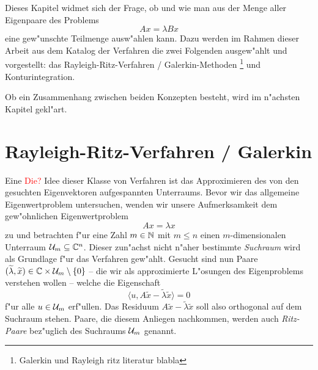 Dieses Kapitel widmet sich der Frage, ob und wie man aus der Menge aller Eigenpaare
des Problems
\[
Ax = \lambda Bx
\]
eine gew"unschte Teilmenge ausw"ahlen kann. Dazu werden im Rahmen dieser Arbeit aus dem Katalog der Verfahren
die zwei Folgenden ausgew"ahlt und vorgestellt: das Rayleigh-Ritz-Verfahren / Galerkin-Methoden
\footnote{Galerkin und Rayleigh ritz literatur blabla} und Konturintegration.

Ob ein Zusammenhang zwischen beiden Konzepten besteht, wird im n"achsten Kapitel gekl"art.\\


\section{Rayleigh-Ritz-Verfahren / Galerkin}
Eine \textcolor{red}{Die?} Idee dieser Klasse von Verfahren ist das Approximieren des von
den gesuchten Eigenvektoren aufgespannten Unterraums. %
Bevor wir das allgemeine Eigenwertproblem untersuchen, wenden wir unsere Aufmerksamkeit
dem gew"ohnlichen Eigenwertproblem
\[
Ax = \lambda x%
\]
zu und betrachten f"ur eine Zahl $m\in\mathbb{N}$ mit $m\le n$
einen $m$-dimensionalen Unterraum $\mathcal{U}_m\subseteq\mathbb{C}^n$. Dieser zun"achst nicht
n"aher bestimmte \emph{Suchraum} wird als Grundlage f"ur das Verfahren gew"ahlt.
Gesucht sind nun Paare $(\widetilde{\lambda}, \widetilde{x})\in\mathbb{C}\times \mathcal{U}_m \setminus\{0\}$ --
die wir als approximierte L"osungen des Eigenproblems verstehen wollen --
welche die Eigenschaft
\begin{equation}\label{eq:orthogonal}
\langle u, A\widetilde{x} - \widetilde{\lambda}\widetilde{x} \rangle=0
\end{equation}
f"ur alle $u \in \mathcal{U}_m $ erf"ullen. Das Residuum $A\widetilde{x} - \widetilde{\lambda}\widetilde{x}$
soll also orthogonal auf dem Suchraum stehen. Paare, die diesem Anliegen nachkommen,
werden auch \emph{Ritz-Paare} bez"uglich des Suchraums $\mathcal{U}_m$ genannt.\\

